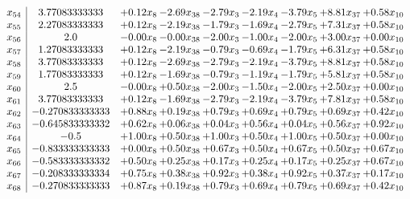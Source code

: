 \documentclass[8pt]{article}
\begin{document}
\[\begin{array}{c| c c@{\hskip 2pt} c@{\hskip 2pt} c@{\hskip 2pt} c@{\hskip 2pt} c@{\hskip 2pt} c@{\hskip 2pt} c@{\hskip 2pt} }
 x_{54}   &  3.77083333333 & +  0.12 x_{8} & -2.69 x_{38} & -2.79 x_{3} & -2.19 x_{4} & -3.79 x_{5} & +  8.81 x_{37} & +  0.58 x_{10}\\
 x_{55}   &  2.27083333333 & +  0.12 x_{8} & -2.19 x_{38} & -1.79 x_{3} & -1.69 x_{4} & -2.79 x_{5} & +  7.31 x_{37} & +  0.58 x_{10}\\
 x_{56}   &  2.0 & -0.00 x_{8} & -0.00 x_{38} & -2.00 x_{3} & -1.00 x_{4} & -2.00 x_{5} & +  3.00 x_{37} & +  0.00 x_{10}\\
 x_{57}   &  1.27083333333 & +  0.12 x_{8} & -2.19 x_{38} & -0.79 x_{3} & -0.69 x_{4} & -1.79 x_{5} & +  6.31 x_{37} & +  0.58 x_{10}\\
 x_{58}   &  3.77083333333 & +  0.12 x_{8} & -2.69 x_{38} & -2.79 x_{3} & -2.19 x_{4} & -3.79 x_{5} & +  8.81 x_{37} & +  0.58 x_{10}\\
 x_{59}   &  1.77083333333 & +  0.12 x_{8} & -1.69 x_{38} & -0.79 x_{3} & -1.19 x_{4} & -1.79 x_{5} & +  5.81 x_{37} & +  0.58 x_{10}\\
 x_{60}   &  2.5 & -0.00 x_{8} & +  0.50 x_{38} & -2.00 x_{3} & -1.50 x_{4} & -2.00 x_{5} & +  2.50 x_{37} & +  0.00 x_{10}\\
 x_{61}   &  3.77083333333 & +  0.12 x_{8} & -1.69 x_{38} & -2.79 x_{3} & -2.19 x_{4} & -3.79 x_{5} & +  7.81 x_{37} & +  0.58 x_{10}\\
 x_{62}   &  -0.270833333333 & +  0.88 x_{8} & +  0.19 x_{38} & +  0.79 x_{3} & +  0.69 x_{4} & +  0.79 x_{5} & +  0.69 x_{37} & +  0.42 x_{10}\\
 x_{63}   &  -0.645833333332 & +  0.62 x_{8} & +  0.06 x_{38} & +  0.04 x_{3} & +  0.56 x_{4} & +  0.04 x_{5} & +  0.56 x_{37} & +  0.92 x_{10}\\
 x_{64}   &  -0.5 & +  1.00 x_{8} & +  0.50 x_{38} & +  1.00 x_{3} & +  0.50 x_{4} & +  1.00 x_{5} & +  0.50 x_{37} & +  0.00 x_{10}\\
 x_{65}   &  -0.833333333333 & +  0.00 x_{8} & +  0.50 x_{38} & +  0.67 x_{3} & +  0.50 x_{4} & +  0.67 x_{5} & +  0.50 x_{37} & +  0.67 x_{10}\\
 x_{66}   &  -0.583333333332 & +  0.50 x_{8} & +  0.25 x_{38} & +  0.17 x_{3} & +  0.25 x_{4} & +  0.17 x_{5} & +  0.25 x_{37} & +  0.67 x_{10}\\
 x_{67}   &  -0.208333333334 & +  0.75 x_{8} & +  0.38 x_{38} & +  0.92 x_{3} & +  0.38 x_{4} & +  0.92 x_{5} & +  0.37 x_{37} & +  0.17 x_{10}\\
 x_{68}   &  -0.270833333333 & +  0.87 x_{8} & +  0.19 x_{38} & +  0.79 x_{3} & +  0.69 x_{4} & +  0.79 x_{5} & +  0.69 x_{37} & +  0.42 x_{10}\\

\end{array}\]
\end{document}
